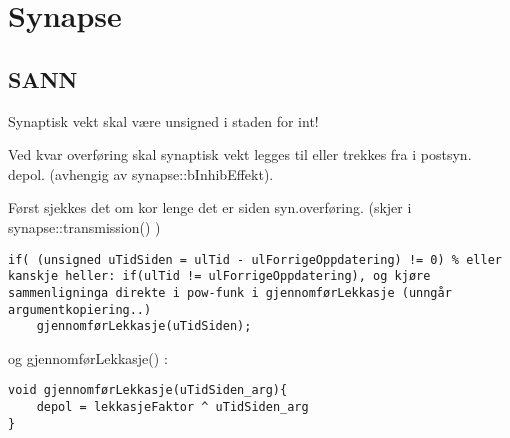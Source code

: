 
\section{Synapse}

\subsection{SANN}
Synaptisk vekt skal være unsigned i staden for int!

Ved kvar overføring skal synaptisk vekt legges til eller trekkes fra i postsyn. depol. (avhengig av synapse::bInhibEffekt). 

Først sjekkes det om kor lenge det er siden syn.overføring.  (skjer i synapse::transmission() )
\begin{lstlisting}
if( (unsigned uTidSiden = ulTid - ulForrigeOppdatering) != 0) % eller kanskje heller: if(ulTid != ulForrigeOppdatering), og kjøre sammenligninga direkte i pow-funk i gjennomførLekkasje (unngår argumentkopiering..)
	gjennomførLekkasje(uTidSiden);
\end{lstlisting}

og gjennomførLekkasje() :
\begin{lstlisting}
void gjennomførLekkasje(uTidSiden_arg){
	depol = lekkasjeFaktor ^ uTidSiden_arg		
}
\end{lstlisting}
